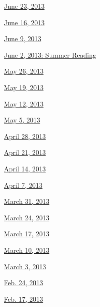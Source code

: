 \href{http://www.nytimes3xbfgragh.onion/indexes/2013/06/23/books/review/index.html}{June
23, 2013}

\href{http://www.nytimes3xbfgragh.onion/indexes/2013/06/16/books/review/index.html}{June
16, 2013}

\href{http://www.nytimes3xbfgragh.onion/indexes/2013/06/09/books/review/index.html}{June
9, 2013}

\href{http://www.nytimes3xbfgragh.onion/indexes/2013/06/02/books/review/index.html}{June
2, 2013: Summer Reading}

\href{http://www.nytimes3xbfgragh.onion/indexes/2013/05/26/books/review/index.html}{May
26, 2013}

\href{http://www.nytimes3xbfgragh.onion/indexes/2013/05/19/books/review/index.html}{May
19, 2013}

\href{http://www.nytimes3xbfgragh.onion/indexes/2013/05/12/books/review/index.html}{May
12, 2013}

\href{http://www.nytimes3xbfgragh.onion/indexes/2013/05/05/books/review/index.html}{May
5, 2013}

\href{http://www.nytimes3xbfgragh.onion/indexes/2013/04/28/books/review/index.html}{April
28, 2013}

\href{http://www.nytimes3xbfgragh.onion/indexes/2013/04/21/books/review/index.html}{April
21, 2013}

\href{http://www.nytimes3xbfgragh.onion/indexes/2013/04/14/books/review/index.html}{April
14, 2013}

\href{http://www.nytimes3xbfgragh.onion/indexes/2013/04/07/books/review/index.html}{April
7, 2013}

\href{http://www.nytimes3xbfgragh.onion/indexes/2013/03/31/books/review/index.html}{March
31, 2013}

\href{http://www.nytimes3xbfgragh.onion/indexes/2013/03/24/books/review/index.html}{March
24, 2013}

\href{http://www.nytimes3xbfgragh.onion/indexes/2013/03/17/books/review/index.html}{March
17, 2013}

\href{http://www.nytimes3xbfgragh.onion/indexes/2013/03/10/books/review/index.html}{March
10, 2013}

\href{http://www.nytimes3xbfgragh.onion/indexes/2013/03/03/books/review/index.html}{March
3, 2013}

\href{http://www.nytimes3xbfgragh.onion/indexes/2013/02/24/books/review/index.html}{Feb.
24, 2013}

\href{http://www.nytimes3xbfgragh.onion/indexes/2013/02/17/books/review/index.html}{Feb.
17, 2013}

